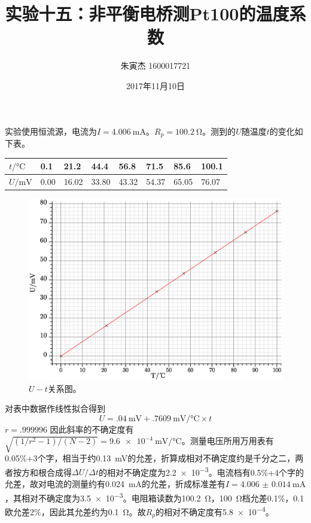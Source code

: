 \documentclass[UTF8]{ctexart}
\title{实验十五：非平衡电桥测Pt100的温度系数}
\author{朱寅杰 1600017721}
\date{2017年11月10日}
\begin{document}
\maketitle

实验使用恒流源，电流为$I=\SI{4.006}{\milli\ampere}$。$R_p=\SI{100.2}{\ohm}$。测到的$U$随温度$t$的变化如下表。
\begin{center}
\begin{tabu} to \linewidth {X[c]|X[c] X[c] X[c] X[c] X[c] X[c] X[c]}
\hline
$t/\si{\celsius}$	&0.1	&21.2	&44.4	&56.8	&71.5	&85.6	&100.1
\\
\hline
$U/\si{\milli\volt}$	&0.00	&16.02	&33.80	&43.32	&54.37	&65.05	&76.07
\\
\hline
\end{tabu}
\end{center}

\begin{figure}[h]
  \includegraphics[width=\linewidth,keepaspectratio=true]{Pt100.eps}
  \caption{$U-t$关系图。}
\end{figure}
对表中数据作线性拟合得到
\begin{equation}
  U=\SI{.04}{\milli\volt}+\SI{.7609}{\milli\volt\per\celsius}\times t
\end{equation}
$r=\num{.999996}$
因此斜率的不确定度有$\sqrt{(1/r^2-1)/(N-2)}=\SI{9.6e-4}{\milli\volt\per\celsius}$。测量电压所用万用表有0.05\%+3个字，相当于约\SI{.13}{\milli\volt}的允差，折算成相对不确定度约是千分之二，两者按方和根合成得$\Delta U/\Delta t$的相对不确定度为\num{2.2e-3}。电流档有0.5\%+4个字的允差，故对电流的测量约有\SI{.024}{\milli\ampere}的允差，折成标准差有$I=\SI{4.006(14)}{\milli\ampere}$，其相对不确定度为\num{3.5e-3}。电阻箱读数为\SI{100.2}{\ohm}，\SI{100}{\ohm}档允差0.1\%，0.1欧允差2\%，因此其允差约为\SI{0.1}{\ohm}。故$R_p$的相对不确定度有\num{5.8e-4}。
\end{document}
